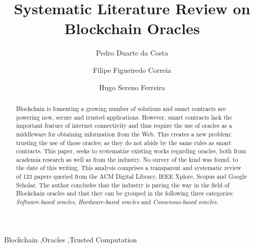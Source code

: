 \documentclass[final,3p,12pt,twocolumn]{elsarticle}
\begin{document}
\begin{frontmatter}




  \title{\textbf{Systematic Literature Review on Blockchain Oracles} }

  \author[add1]{Pedro Duarte da Costa}
  \author[add1]{Filipe Figueiredo Correia}
  \author[add1]{Hugo Sereno Ferreira}

  \address[add1]{Faculty of Engineering, University of Porto, Oporto, Portugal}

  \begin{abstract}
  Blockchain is fomenting a growing number of solutions and smart contracts are powering new, secure and trusted applications. However, smart contracts lack the important feature of internet connectivity and thus require the use of oracles as a middleware for obtaining information from the Web. This creates a new problem: trusting the use of those oracles; as they do not abide by the same rules as smart contracts. This paper, seeks to systematize existing works regarding oracles, both from academia research as well as from the industry. No survey of the kind was found, to the date of this writing. This analysis comprises a transparent and systematic review of 123 papers queried from the ACM Digital Library, IEEE Xplore, Scopus and Google Scholar. The author concludes that the industry is paving the way in the field of Blockchain oracles and that they can be grouped in the following three categories: \textit{Software-based oracles}, \textit{Hardware-based oracles} and \textit{Consensus-based  oracles}.

  \end{abstract}
  \begin{keyword}
    Blockchain \sep Oracles \sep Trusted Computation

  \end{keyword}



\end{frontmatter}
\end{document}
